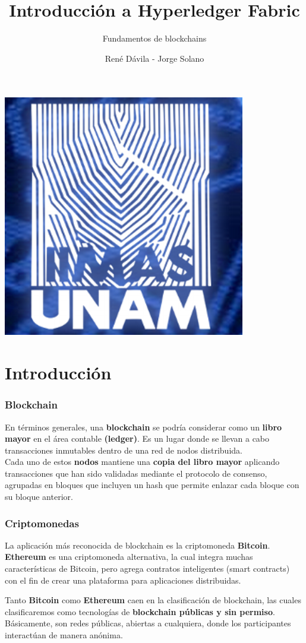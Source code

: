 \documentclass{beamer}
\title[]{Introducción a Hyperledger Fabric}
\subtitle{Fundamentos de blockchains}
\author{René Dávila - Jorge Solano}
\date{ }
\begin{document}
	\EnableBpAbbreviations
	
	\begin{frame}
		\begin{center}
			\includegraphics [width =0.2 \textwidth ]{iimas}
		\end{center}
		\titlepage 
	\end{frame}

	\section{Introducción}
	\begin{frame}
		\frametitle{Blockchain}
		En términos generales, una \textbf{blockchain} se podría considerar como un \textbf{libro mayor} en el área contable \textbf{(ledger)}. Es un lugar donde se llevan a cabo transacciones inmutables dentro de una red de nodos distribuida.\\
		\vspace{4mm}
		Cada uno de estos \textbf{nodos} mantiene una \textbf{copia del libro mayor} aplicando transacciones que han sido validadas mediante el protocolo de consenso, agrupadas en bloques que incluyen un hash que permite enlazar cada bloque con su bloque anterior.
	\end{frame}
	
	\begin{frame}
		\frametitle{Criptomonedas}
		La aplicación más reconocida de blockchain es la criptomoneda \textbf{Bitcoin}.\\
		\vspace{4mm}
		\textbf{Ethereum} es una criptomoneda alternativa, la cual integra muchas características de Bitcoin, pero agrega contratos inteligentes (smart contracts) con el fin de crear una plataforma para aplicaciones distribuidas.
	\end{frame}
	
	\begin{frame}
		Tanto \textbf{Bitcoin} como \textbf{Ethereum} caen en la clasificación de blockchain, las cuales clasificaremos como tecnologías de \textbf{blockchain públicas y sin permiso}. Básicamente, son redes públicas, abiertas a cualquiera, donde los participantes interactúan de manera anónima.
	\end{frame}
\end{document}
